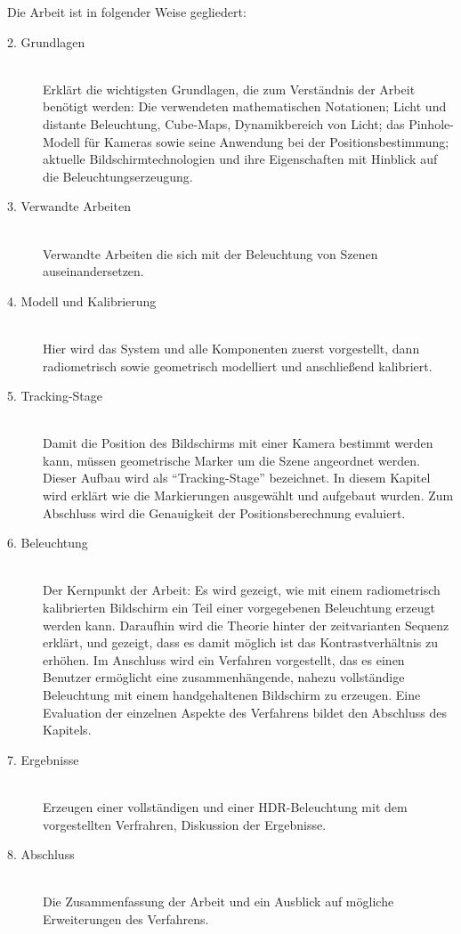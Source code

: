 Die Arbeit ist in folgender Weise gegliedert:
\begin{description}
   \item[2. Grundlagen] \hfill \\
       Erklärt die wichtigsten Grundlagen, die zum Verständnis der Arbeit benötigt werden:
       Die verwendeten mathematischen Notationen; Licht und distante Beleuchtung, Cube-Maps, Dynamikbereich von Licht; das Pinhole-Modell für Kameras sowie seine Anwendung bei der Positionsbestimmung;  aktuelle Bildschirmtechnologien  und ihre Eigenschaften mit Hinblick auf die Beleuchtungserzeugung.

  \item[3. Verwandte Arbeiten] \hfill \\
       Verwandte Arbeiten die sich mit der Beleuchtung von Szenen auseinandersetzen.

  \item[4. Modell und Kalibrierung] \hfill \\
       Hier wird das System und alle Komponenten zuerst vorgestellt, dann radiometrisch sowie geometrisch modelliert und anschließend kalibriert.
  
  \item[5. Tracking-Stage] \hfill \\
      Damit die Position des Bildschirms mit einer Kamera bestimmt werden kann, müssen geometrische Marker um die Szene angeordnet werden. Dieser Aufbau wird als ``Tracking-Stage'' bezeichnet.
      In diesem Kapitel wird erklärt wie die Markierungen ausgewählt und aufgebaut wurden.
      Zum Abschluss wird die Genauigkeit der Positionsberechnung evaluiert.
       
      
  \item[6. Beleuchtung] \hfill \\
       Der Kernpunkt der Arbeit: Es wird gezeigt, wie mit einem radiometrisch kalibrierten Bildschirm ein Teil einer vorgegebenen Beleuchtung erzeugt werden kann.
       Daraufhin wird die Theorie hinter der zeitvarianten Sequenz erklärt, und gezeigt, dass es damit möglich ist das Kontrastverhältnis zu erhöhen.
      Im Anschluss wird ein Verfahren vorgestellt, das es einen Benutzer ermöglicht eine zusammenhängende, nahezu vollständige Beleuchtung mit einem handgehaltenen Bildschirm zu erzeugen.
       Eine Evaluation der einzelnen Aspekte des Verfahrens bildet den Abschluss des Kapitels.
      
  \item[7. Ergebnisse] \hfill \\
       Erzeugen einer vollständigen und einer HDR-Beleuchtung mit dem vorgestellten Verfrahren, Diskussion der Ergebnisse.

  \item[8. Abschluss] \hfill \\
       Die Zusammenfassung der Arbeit und ein Ausblick auf mögliche Erweiterungen des Verfahrens.

\end{description}
